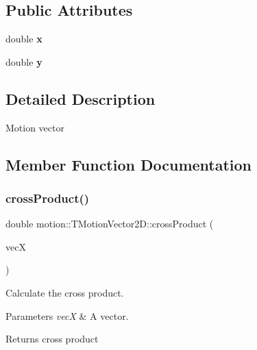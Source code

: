 \subsection*{Public Attributes}
\begin{DoxyCompactItemize}
\item 
\mbox{\label{structmotion_1_1TMotionVector2D_a07d1c2d9fe6d0ec6c2b64db64f6c9e48}} 
double {\bfseries x}
\item 
\mbox{\label{structmotion_1_1TMotionVector2D_aeb04b131498d4c331819bfff3a60f80d}} 
double {\bfseries y}
\end{DoxyCompactItemize}


\subsection{Detailed Description}
Motion vector ~\newline


\subsection{Member Function Documentation}
\mbox{\label{structmotion_1_1TMotionVector2D_adba9d2291b5dfe245c9b1009bb4c0e64}} 
\subsubsection{\texorpdfstring{cross\+Product()}{crossProduct()}}
{\footnotesize\ttfamily double motion\+::\+T\+Motion\+Vector2\+D\+::cross\+Product (\begin{DoxyParamCaption}\item[{\mbox{\hyperlink{structmotion_1_1TMotionVector2D}{T\+Motion\+Vector2D}}}]{vecX }\end{DoxyParamCaption})\hspace{0.3cm}{\ttfamily [inline]}}

Calculate the cross product. 
\begin{DoxyParams}{Parameters}
{\em vecX} & A vector. \\
\hline
\end{DoxyParams}
\begin{DoxyReturn}{Returns}
cross product 
\end{DoxyReturn}
\mbox{\label{structmotion_1_1TMotionVector2D_a132bcb4fea81db58a825d28bb1ed5320}} 
